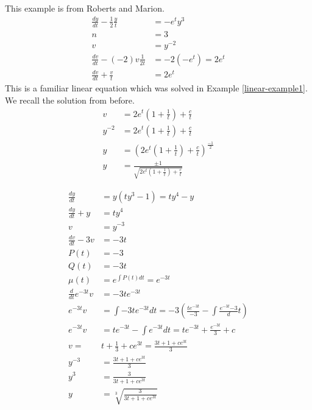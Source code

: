 \documentclass[fleqn,letterpaper]{report}
\begin{document}
\begin{example}
This example is from Roberts and Marion.
\begin{align*}
\frac{dy}{dt} - \frac{1}{2} \frac{y}{t} & = -e^t y^3 \\
n & =3 \\
v & = y^{-2} \\
\frac{dv}{dt} - (-2) v \frac{1}{2t} & = -2 (-e^t) = 2e^t \\
\frac{dv}{dt} + \frac{v}{t} & = 2e^t 
\end{align*}
This is a familiar linear equation which was solved
in Example \ref{linear-example1}. We recall the solution
from before.
\begin{align*}
v & = 2e^t \left( 1 + \frac{1}{t} \right) + \frac{c}{t} \\
y^{-2} & = 2e^t \left( 1 + \frac{1}{t} \right) + \frac{c}{t} \\
y & = \left( 2e^t \left( 1 + \frac{1}{t} \right) + \frac{c}{t}
\right)^{\frac{-1}{2}}\\
y & = \frac{\pm1}{\sqrt{2e^t \left( 1 + \frac{1}{t} \right) +
\frac{c}{t}}}
\end{align*}
\end{example}

\begin{example}
\begin{align*}
\frac{dy}{dt} & = y(ty^3 -1) = ty^4 - y \\
\frac{dy}{dt} + y & = ty^4 \\
v & = y^{-3} \\
\frac{dv}{dt} - 3v & = -3t \\
P(t) & = -3 \\
Q(t) & = -3t \\
\mu(t) & = e^{\int P(t) dt} = e^{-3t} \\
\frac{d}{dt} e^{-3t} v & = -3t e^{-3t} \\
e^{-3t} v & = \int -3t e^{-3t} dt = -3 \left(
\frac{te^{-3t}}{-3} - \int \frac{e^{-3t}{-3}} dt \right) \\
e^{-3t} v & = t e^{-3t} - \int e^{-3t} dt = t e^{-3t} +
\frac{e^{-3t}}{3} + c \\
v = & t + \frac{1}{3} + ce^{3t} = \frac{3t + 1 + ce^{3t}}{3} \\
y^{-3} & = \frac{3t + 1 + ce^{3t}}{3} \\
y^3 & = \frac{3}{3t + 1 + ce^{3t}} \\
y & = \sqrt[3]{\frac{3}{3t + 1 + ce^{3t}}} 
\end{align*}
\end{example}
\end{document}
